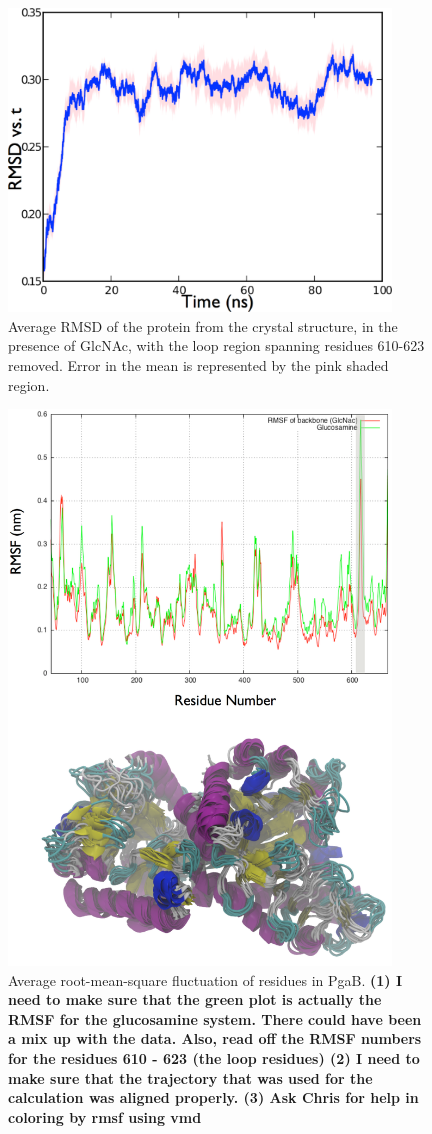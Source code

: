 \begin{figure}[htbp]
\centering
\includegraphics[width=4in]{figures/results4/rmsd.pdf}
\caption[RMSD vs. time of PgaB]{Average RMSD of the protein from the crystal structure, in the presence of GlcNAc, with the loop region spanning residues 610-623 removed. Error in the mean is represented by the pink shaded region.}
\label{fig:rmsd}
\end{figure}

\begin{figure}[htbp]
\centering
\includegraphics[width=4in]{figures/results4/rmsf.pdf}
\caption[RMSF of residues in PgaB]{Average root-mean-square fluctuation of residues in PgaB. \textbf{(1) I need to make sure that the green plot is actually the RMSF for the glucosamine system. There could have been a mix up with the data. Also, read off the RMSF numbers for the residues 610 - 623 (the loop residues) (2) I need to make sure that the trajectory that was used for the calculation was aligned properly. (3) Ask Chris for help in coloring by rmsf using vmd}}
\label{fig:rmsf}
\end{figure}

